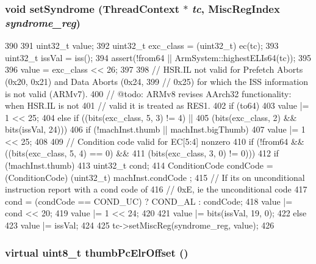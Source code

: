 {\subsubsection[{setSyndrome}]{\setlength{\rightskip}{0pt plus 5cm}void setSyndrome ({\bf ThreadContext} $\ast$ {\em tc}, \/  {\bf MiscRegIndex} {\em syndrome\_\-reg})}}
\label{classArmISA_1_1ArmFault_a618b248f8f365d00661d7663152848d6}



\begin{DoxyCode}
390 {
391     uint32_t value;
392     uint32_t exc_class = (uint32_t) ec(tc);
393     uint32_t issVal = iss();
394     assert(!from64 || ArmSystem::highestELIs64(tc));
395 
396     value = exc_class << 26;
397 
398     // HSR.IL not valid for Prefetch Aborts (0x20, 0x21) and Data Aborts (0x24,
399     // 0x25) for which the ISS information is not valid (ARMv7).
400     // @todo: ARMv8 revises AArch32 functionality: when HSR.IL is not
401     // valid it is treated as RES1.
402     if (to64) {
403         value |= 1 << 25;
404     } else if ((bits(exc_class, 5, 3) != 4) ||
405                (bits(exc_class, 2) && bits(issVal, 24))) {
406         if (!machInst.thumb || machInst.bigThumb)
407             value |= 1 << 25;
408     }
409     // Condition code valid for EC[5:4] nonzero
410     if (!from64 && ((bits(exc_class, 5, 4) == 0) &&
411                     (bits(exc_class, 3, 0) != 0))) {
412         if (!machInst.thumb) {
413             uint32_t      cond;
414             ConditionCode condCode = (ConditionCode) (uint32_t) machInst.condCode
      ;
415             // If its on unconditional instruction report with a cond code of
416             // 0xE, ie the unconditional code
417             cond  = (condCode == COND_UC) ? COND_AL : condCode;
418             value |= cond << 20;
419             value |= 1    << 24;
420         }
421         value |= bits(issVal, 19, 0);
422     } else {
423         value |= issVal;
424     }
425     tc->setMiscReg(syndrome_reg, value);
426 }
\end{DoxyCode}
\hypertarget{classArmISA_1_1ArmFault_a846a83fa30036c124fe623647dd70c5d}{
\subsubsection[{thumbPcElrOffset}]{\setlength{\rightskip}{0pt plus 5cm}virtual uint8\_\-t thumbPcElrOffset ()}}
\label{classArmISA_1_1ArmFault_a846a83fa30036c124fe623647dd70c5d}


